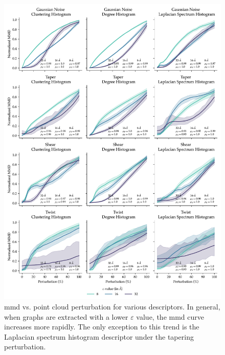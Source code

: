 \begin{figure}
  \includegraphics[width=\textwidth]{./figures/results/res_2_1.pdf}
  \caption[Influence of $\varepsilon$ on the sensitivity of \gls{mmd} to perturbations.]{\gls{mmd} vs. point cloud perturbation for various descriptors. In general,
when graphs are extracted with a lower $\varepsilon$ value, the \gls{mmd} curve
increases more rapidly. The only exception to this trend is the Laplacian
spectrum histogram descriptor under the tapering perturbation.}
  \label{fig:mmd_sensitivity_eps}
\end{figure}

